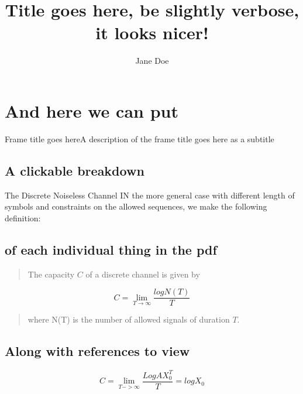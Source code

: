 \documentclass[]{beamer}
\title{Title goes here, be slightly verbose, it looks nicer!}
\author{Jane Doe}
\begin{document}
\maketitle
\section{And here we can put}
\begin{frame}[t]{Frame title goes here}{A description of the frame title goes here as a subtitle}
  \subsection{A clickable breakdown}
  \begin{exampleblock}{The Discrete Noiseless Channel}
    IN the more general case with different length of symbols and constraints on the allowed sequences, we make the following definition:
    \subsection{of each individual thing in the pdf}
    \begin{quote}
      The capacity $C$ of a discrete channel is given by
    \end{quote}
    \[ C = \lim_{T \to \infty}  \frac{logN(T)}{T}\]

    \begin{quote}
    where N(T) is the number of allowed signals of duration $T$.
  \end{quote}
\end{exampleblock}
\subsection{Along with references to view}
  \begin{theorem}
    \[C = \lim_{T->\infty}\frac{LogAX^{T}_{0}}{T} = logX_{0}\]
  \end{theorem}
\end{frame}
\end{document}
